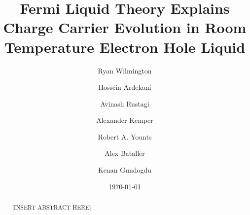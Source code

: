 \documentclass[aps,prb,preprint,groupedaddress]{revtex4-2}
\begin{document}


\title{Fermi Liquid Theory Explains Charge Carrier Evolution in Room Temperature Electron Hole Liquid}


\author{Ryan Wilmington}

\author{Hossein Ardekani}

\author{Avinash Rustagi}

\author{Alexander Kemper}

\author{Robert A. Younts}

\author{Alex Bataller}

\author{Kenan Gundogdu}



\date{\today}

\begin{abstract}
[INSERT ABSTRACT HERE]
\end{abstract}
\end{document}
